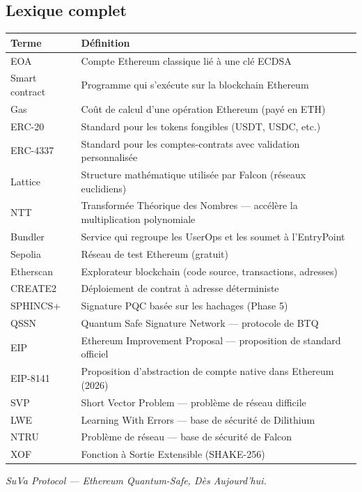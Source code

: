 \documentclass[11pt,a4paper]{article}
\begin{document}
\subsection{Lexique complet}

\begin{longtable}{@{}p{3cm}p{11cm}@{}}
\toprule
\textbf{Terme} & \textbf{Définition} \\
\midrule
\endhead
EOA & Compte Ethereum classique lié à une clé ECDSA \\
Smart contract & Programme qui s'exécute sur la blockchain Ethereum \\
Gas & Coût de calcul d'une opération Ethereum (payé en ETH) \\
ERC-20 & Standard pour les tokens fongibles (USDT, USDC, etc.) \\
ERC-4337 & Standard pour les comptes-contrats avec validation personnalisée \\
Lattice & Structure mathématique utilisée par Falcon (réseaux euclidiens) \\
NTT & Transformée Théorique des Nombres --- accélère la multiplication polynomiale \\
Bundler & Service qui regroupe les UserOps et les soumet à l'EntryPoint \\
Sepolia & Réseau de test Ethereum (gratuit) \\
Etherscan & Explorateur blockchain (code source, transactions, adresses) \\
CREATE2 & Déploiement de contrat à adresse déterministe \\
SPHINCS+ & Signature PQC basée sur les hachages (Phase 5) \\
QSSN & Quantum Safe Signature Network --- protocole de BTQ \\
EIP & Ethereum Improvement Proposal --- proposition de standard officiel \\
EIP-8141 & Proposition d'abstraction de compte native dans Ethereum (2026) \\
SVP & Short Vector Problem --- problème de réseau difficile \\
LWE & Learning With Errors --- base de sécurité de Dilithium \\
NTRU & Problème de réseau --- base de sécurité de Falcon \\
XOF & Fonction à Sortie Extensible (SHAKE-256) \\
\bottomrule
\end{longtable}

\vspace{2em}
\begin{center}
\textit{SuVa Protocol --- Ethereum Quantum-Safe, Dès Aujourd'hui.}
\end{center}
\end{document}
